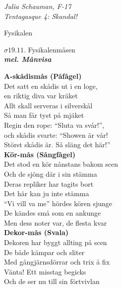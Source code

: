 \documentclass[a6paper,10pt]{article}
\newcommand{\mel}[1]{\small\textbf{\textit{mel. #1 \\}}}
\begin{document}
\begin{flushright}
\textit{Julia Schauman, F-17 \\ Tentagasque 4: Skandal!}
\end{flushright}
\setlength{\oddsidemargin}{-0.37in}
\noindent
\begin{center}
\LARGE Fysikalen \\
\end{center}
\begin{center}
\Large $\sigma19.11$. Fysikalenmåsen \\
\mel{Månvisa}
\end{center}\small
\vspace{30pt} \textbf{A-skådismås (Påfågel)}
\vspace{5pt}\\
Det satt en skådis ut i en loge,\\
en riktig diva var kräket\\
Allt skall serveras i silverskål\\
Så man får tyst på mjäket\\
Regin den rope: “Sluta va svår!”,\\
och skådis svarte: “Showen är vår!\\
Störst skådis är. Så släng det här!”
\vspace{30pt}\\
\textbf{Kör-mås (Sångfågel)}
\vspace{5pt}\\
Det stod en kör nånstans bakom scen\\ 
Och de sjöng där i sin stämma\\
Deras repliker har tagits bort\\
Det här kan ju inte stämma\\
“Vi vill va me” hördes kören sjunge\\
De kändes små som en ankunge\\
Men dess noter var, de flesta kvar
\newpage
\setlength{\oddsidemargin}{-0.47in}
\noindent
\vspace{30pt}\\
\textbf{Dekor-mås (Svala)}
\vspace{5pt}\\
Dekoren har byggt allting på scen\\
De både kämpar och sliter\\
Med gångjärnsdörrar och trix å fix\\
Vänta! Ett misstag begicks\\
Och de ser nu till sin förtvivlan\\
\end{document}

